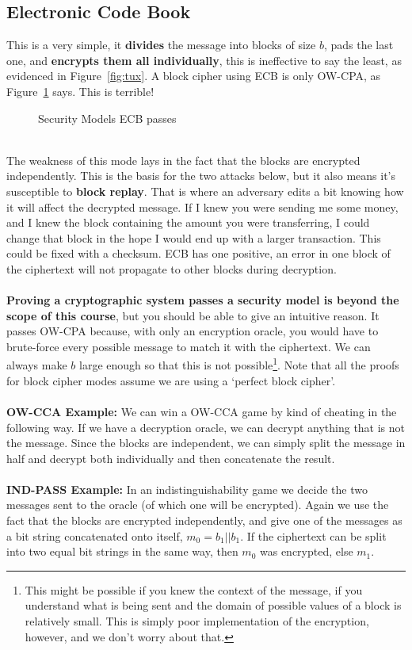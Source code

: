     \subsection{Electronic Code Book}
    This is a very simple, it \textbf{divides} the message into blocks of size $b$, pads the last one, and \textbf{encrypts them all individually}, this is ineffective to say the least, as evidenced in Figure~\ref{fig:tux}. A block cipher using ECB is only OW-CPA, as Figure~\ref{fig:ecb-attacktable} says. 
    This is terrible!\\
    \begin{figure}[htp!]
    \centering
    \caption{Security Models ECB passes}
    \label{fig:ecb-attacktable}
    \end{figure}
    \\
    The weakness of this mode lays in the fact that the blocks are encrypted independently. This is the basis for the two attacks below, but it also means it's susceptible to \textbf{block replay}. That is where an adversary edits a bit knowing how it will affect the decrypted message. If I knew you were sending me some money, and I knew the block containing the amount you were transferring, I could change that block in the hope I would end up with a larger transaction. This could be fixed with a checksum. ECB has one positive, an error in one block of the ciphertext will not propagate to other blocks during decryption.\\
    \\
    \textbf{Proving a cryptographic system passes a security model is beyond the scope of this course}, but you should be able to give an intuitive reason. It passes OW-CPA because, with only an encryption oracle, you would have to brute-force every possible message to match it with the ciphertext. We can always make $b$ large enough so that this is not possible\footnote{This might be possible if you knew the context of the message, if you understand what is being sent and the domain of possible values of a block is relatively small. This is simply poor implementation of the encryption, however, and we don't worry about that.}. Note that all the proofs for block cipher modes assume we are using a `perfect block cipher'.\\
    \\
    \textbf{OW-CCA Example:} We can win a OW-CCA game by kind of cheating in the following way. If we have a decryption oracle, we can decrypt anything that is not the message. Since the blocks are independent, we can simply split the message in half and decrypt both individually and then concatenate the result.\\
    \\
    \textbf{IND-PASS Example:} In an indistinguishability game we decide the two messages sent to the oracle (of which one will be encrypted). Again we use the fact that the blocks are encrypted independently, and give one of the messages as a bit string concatenated onto itself, $m_0=b_1||b_1$. If the ciphertext can be split into two equal bit strings in the same way, then $m_0$ was encrypted, else $m_1$.
    

